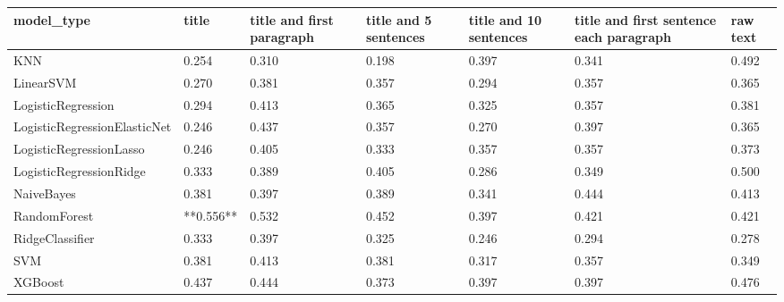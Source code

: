 \begin{tabular}{lllllll}
\toprule
                  model\_type &     title & title and first paragraph & title and 5 sentences & title and 10 sentences & title and first sentence each paragraph & raw text \\
\midrule
                         KNN &     0.254 &                     0.310 &                 0.198 &                  0.397 &                                   0.341 &    0.492 \\
                   LinearSVM &     0.270 &                     0.381 &                 0.357 &                  0.294 &                                   0.357 &    0.365 \\
          LogisticRegression &     0.294 &                     0.413 &                 0.365 &                  0.325 &                                   0.357 &    0.381 \\
LogisticRegressionElasticNet &     0.246 &                     0.437 &                 0.357 &                  0.270 &                                   0.397 &    0.365 \\
     LogisticRegressionLasso &     0.246 &                     0.405 &                 0.333 &                  0.357 &                                   0.357 &    0.373 \\
     LogisticRegressionRidge &     0.333 &                     0.389 &                 0.405 &                  0.286 &                                   0.349 &    0.500 \\
                  NaiveBayes &     0.381 &                     0.397 &                 0.389 &                  0.341 &                                   0.444 &    0.413 \\
                RandomForest & **0.556** &                     0.532 &                 0.452 &                  0.397 &                                   0.421 &    0.421 \\
             RidgeClassifier &     0.333 &                     0.397 &                 0.325 &                  0.246 &                                   0.294 &    0.278 \\
                         SVM &     0.381 &                     0.413 &                 0.381 &                  0.317 &                                   0.357 &    0.349 \\
                     XGBoost &     0.437 &                     0.444 &                 0.373 &                  0.397 &                                   0.397 &    0.476 \\
\bottomrule
\end{tabular}
